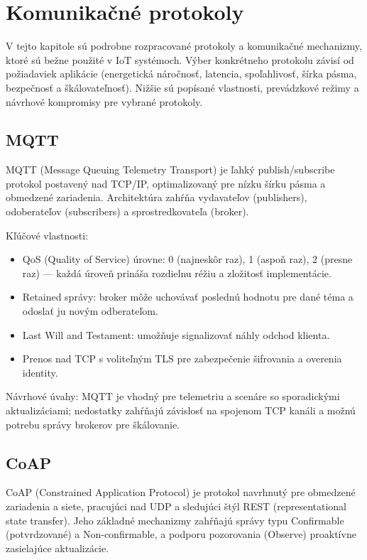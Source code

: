 \section{Komunikačné protokoly}

V tejto kapitole sú podrobne rozpracované protokoly a komunikačné mechanizmy, ktoré sú bežne použité v IoT systémoch. Výber konkrétneho protokolu závisí od požiadaviek aplikácie (energetická náročnosť, latencia, spoľahlivosť, šírka pásma, bezpečnosť a škálovateľnosť). Nižšie sú popísané vlastnosti, prevádzkové režimy a návrhové kompromisy pre vybrané protokoly.

\subsection{MQTT}

MQTT (Message Queuing Telemetry Transport) je ľahký publish/subscribe protokol postavený nad TCP/IP, optimalizovaný pre nízku šírku pásma a obmedzené zariadenia. Architektúra zahŕňa vydavateľov (publishers), odoberateľov (subscribers) a sprostredkovateľa (broker).

Kľúčové vlastnosti:
\begin{itemize}
  \item QoS (Quality of Service) úrovne: 0 (najneskôr raz), 1 (aspoň raz), 2 (presne raz) — každá úroveň prináša rozdielnu réžiu a zložitosť implementácie.
  \item Retained správy: broker môže uchovávať poslednú hodnotu pre dané téma a odoslať ju novým odberateľom.
  \item Last Will and Testament: umožňuje signalizovať náhly odchod klienta.
  \item Prenos nad TCP s voliteľným TLS pre zabezpečenie šifrovania a overenia identity.
\end{itemize}

Návrhové úvahy: MQTT je vhodný pre telemetriu a scenáre so sporadickými aktualizáciami; nedostatky zahŕňajú závislosť na spojenom TCP kanáli a možnú potrebu správy brokerov pre škálovanie.

\subsection{CoAP}

CoAP (Constrained Application Protocol) je protokol navrhnutý pre obmedzené zariadenia a siete, pracujúci nad UDP a sledujúci štýl REST (representational state transfer). Jeho základné mechanizmy zahŕňajú správy typu Confirmable (potvrdzované) a Non-confirmable, a podporu pozorovania (Observe) proaktívne zasielajúce aktualizácie.

